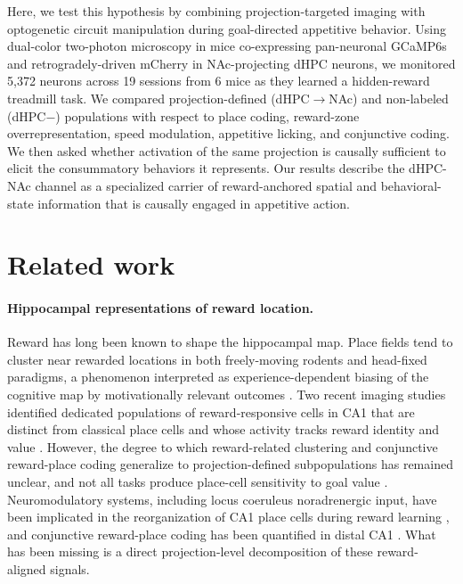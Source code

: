 \documentclass[11pt]{article}
\begin{document}
Here, we test this hypothesis by combining projection-targeted imaging with optogenetic circuit manipulation during goal-directed appetitive behavior. Using dual-color two-photon microscopy in mice co-expressing pan-neuronal GCaMP6s and retrogradely-driven mCherry in NAc-projecting dHPC neurons, we monitored 5{,}372 neurons across 19 sessions from 6 mice as they learned a hidden-reward treadmill task. We compared projection-defined (dHPC$\rightarrow$NAc) and non-labeled (dHPC$-$) populations with respect to place coding, reward-zone overrepresentation, speed modulation, appetitive licking, and conjunctive coding. We then asked whether activation of the same projection is causally sufficient to elicit the consummatory behaviors it represents. Our results describe the dHPC-NAc channel as a specialized carrier of reward-anchored spatial and behavioral-state information that is causally engaged in appetitive action.

\section{Related work}

\paragraph{Hippocampal representations of reward location.}
Reward has long been known to shape the hippocampal map. Place fields tend to cluster near rewarded locations in both freely-moving rodents and head-fixed paradigms, a phenomenon interpreted as experience-dependent biasing of the cognitive map by motivationally relevant outcomes \citep{Hok2007Goal,Mamad2017PlaceField,Sato2020Overrepresentation}. Two recent imaging studies identified dedicated populations of reward-responsive cells in CA1 that are distinct from classical place cells and whose activity tracks reward identity and value \citep{Gauthier2018Reward,Sosa2018Reward}. However, the degree to which reward-related clustering and conjunctive reward-place coding generalize to projection-defined subpopulations has remained unclear, and not all tasks produce place-cell sensitivity to goal value \citep{Duvelle2019PlaceCells}. Neuromodulatory systems, including locus coeruleus noradrenergic input, have been implicated in the reorganization of CA1 place cells during reward learning \citep{Kaufman2020LocusCoeruleus}, and conjunctive reward-place coding has been quantified in distal CA1 \citep{Xiao2020Conjunctive}. What has been missing is a direct projection-level decomposition of these reward-aligned signals.
\end{document}
